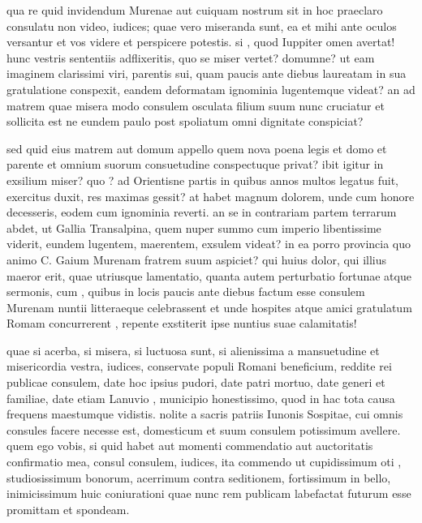  qua re quid invidendum Murenae aut cuiquam nostrum sit in hoc praeclaro consulatu non video, iudices; quae vero miseranda sunt, ea et mihi ante oculos versantur et vos videre et perspicere potestis. si , quod Iuppiter omen avertat! hunc vestris sententiis adflixeritis, quo se miser vertet? domumne? ut eam imaginem clarissimi viri, parentis sui, quam paucis ante diebus laureatam in sua gratulatione conspexit, eandem deformatam ignominia lugentemque videat? an ad matrem quae misera modo consulem osculata filium suum nunc cruciatur et sollicita est ne eundem paulo post spoliatum omni dignitate conspiciat?

 sed quid eius matrem aut domum appello quem nova poena legis et domo et parente et omnium suorum consuetudine conspectuque privat? ibit igitur in exsilium miser? quo ? ad Orientisne partis in quibus annos multos legatus fuit, exercitus duxit, res maximas gessit? at habet magnum dolorem, unde cum honore decesseris, eodem cum ignominia reverti. an se in contrariam partem terrarum abdet, ut Gallia Transalpina, quem nuper summo cum imperio libentissime viderit, eundem lugentem, maerentem, exsulem videat? in ea porro provincia quo animo C. Gaium Murenam fratrem suum aspiciet? qui huius dolor, qui illius maeror erit, quae utriusque lamentatio, quanta autem perturbatio fortunae atque sermonis, cum , quibus in locis paucis ante diebus factum esse consulem Murenam nuntii litteraeque celebrassent et unde hospites atque amici gratulatum Romam concurrerent , repente exstiterit ipse nuntius suae calamitatis!

 quae si acerba, si misera, si luctuosa sunt, si alienissima a mansuetudine et misericordia vestra, iudices, conservate populi Romani beneficium, reddite rei publicae consulem, date hoc ipsius pudori, date patri mortuo, date generi et familiae, date etiam Lanuvio , municipio honestissimo, quod in hac tota causa frequens maestumque vidistis. nolite a sacris patriis Iunonis Sospitae, cui omnis consules facere necesse est, domesticum et suum consulem potissimum avellere. quem ego vobis, si quid habet aut momenti commendatio aut auctoritatis confirmatio mea, consul consulem, iudices, ita commendo ut cupidissimum oti , studiosissimum bonorum, acerrimum contra seditionem, fortissimum in bello, inimicissimum huic coniurationi quae nunc rem publicam labefactat futurum esse promittam et spondeam.
